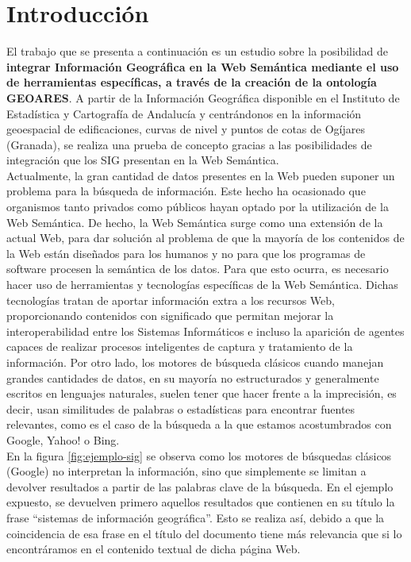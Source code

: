 \section{Introducción}



El trabajo que se presenta a continuación es un estudio sobre la posibilidad de \textbf{integrar Información Geográfica en la Web Semántica mediante el uso de herramientas específicas, a través de la creación de la ontología GEOARES}. A partir de la Información Geográfica disponible en el Instituto de Estadística y Cartografía de Andalucía y centrándonos en la información geoespacial de edificaciones, curvas de nivel y puntos de cotas de Ogíjares (Granada), se realiza una prueba de concepto gracias a las posibilidades de integración que los SIG presentan en la Web Semántica.\\

Actualmente, la gran cantidad de datos presentes en la Web pueden suponer un problema para la búsqueda de información. Este hecho ha ocasionado que organismos tanto privados como públicos hayan optado por la utilización de la Web Semántica. De hecho, la Web Semántica surge como una extensión de la actual Web, para dar solución al problema de que la mayoría de los contenidos de la Web están diseñados para los humanos y no para que los programas de software procesen la semántica de los datos. Para que esto ocurra, es necesario hacer uso de herramientas y tecnologías específicas de la Web Semántica. Dichas tecnologías tratan de aportar información extra a los recursos Web, proporcionando contenidos con significado que permitan mejorar la interoperabilidad entre los Sistemas Informáticos e incluso la aparición de agentes capaces de realizar procesos inteligentes de captura y tratamiento de la información. Por otro lado, los motores de búsqueda clásicos cuando manejan grandes cantidades de datos, en su mayoría no estructurados y generalmente escritos en lenguajes naturales, suelen tener que hacer frente a la imprecisión, es decir, usan similitudes de palabras o estadísticas para encontrar fuentes relevantes, como es el caso de la búsqueda a la que estamos acostumbrados con Google, Yahoo! o Bing.\\



En la figura \ref{fig:ejemplo-sig} se observa como los motores de búsquedas clásicos (Google) no interpretan la información, sino que simplemente se limitan a devolver resultados a partir de las palabras clave de la búsqueda. En el ejemplo expuesto, se devuelven primero aquellos resultados que contienen en su título la frase ``sistemas de información geográfica''. Esto se realiza así, debido a que la coincidencia de esa frase en el título del documento tiene más relevancia que si lo encontráramos en el contenido textual de dicha página Web.

